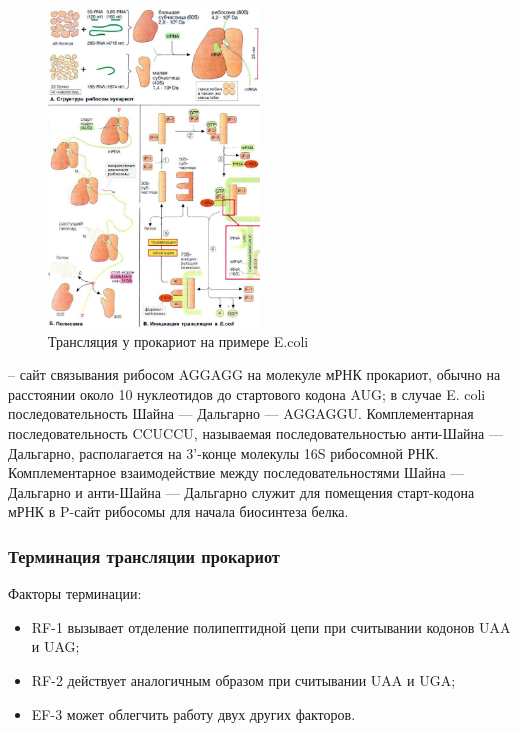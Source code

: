 \begin{figure}[h]
    \centering
    \includegraphics[width=0.5\textwidth]{Pictures/5_6(init_pro).jpg}
    \caption{Трансляция у прокариот на примере E.coli}
    \label{fig:5_6(init_pro)}
\end{figure}

-- сайт связывания рибосом AGGAGG на молекуле мРНК прокариот, обычно на расстоянии около 10 нуклеотидов до стартового кодона AUG; в случае E. coli последовательность Шайна — Дальгарно — AGGAGGU. Комплементарная последовательность CCUCCU, называемая последовательностью анти-Шайна — Дальгарно, располагается на 3'-конце молекулы 16S рибосомной РНК. Комплементарное взаимодействие между последовательностями Шайна — Дальгарно и анти-Шайна — Дальгарно служит для помещения старт-кодона мРНК в P-сайт рибосомы для начала биосинтеза белка.

\subsubsection{Терминация трансляции прокариот}

Факторы терминации:

\begin{itemize}
    \item RF-1 вызывает отделение полипептидной цепи при считывании кодонов UAA и UAG;
    \item RF-2 действует аналогичным образом при считывании UAA и UGA;
    \item EF-3 может облегчить работу двух других факторов.
\end{itemize}

